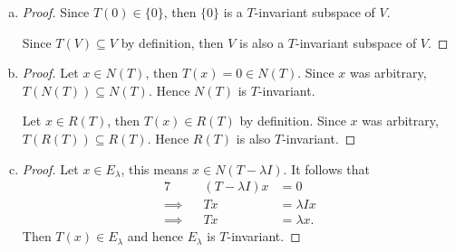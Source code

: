 \begin{Exercise}
\begin{enumerate}[(a)]
\item
\begin{proof}
Since $T(0)\in \{0\}$, then $\{0\}$ is a $T$-invariant subspace of $V$.

Since $T(V)\subseteq V$ by definition, then $V$ is also a $T$-invariant subspace of $V$.
\end{proof}

\item
\begin{proof}
Let $x\in N(T)$, then $T(x) = 0 \in N(T)$. Since $x$ was arbitrary, $T(N(T))\subseteq N(T)$. Hence $N(T)$ is $T$-invariant.

Let $x\in R(T)$, then $T(x) \in R(T)$ by definition. Since $x$ was arbitrary, $T(R(T))\subseteq R(T)$. Hence $R(T)$ is also $T$-invariant.
\end{proof}

\item
\begin{proof}
Let $x\in E_{\lambda}$, this means $x\in N(T-\lambda I)$. It follows that
\begin{alignat*}{7}
\quad&& (T-\lambda I)x &= 0 \\
\implies&& T x &= \lambda I x \\
\implies&& T x &= \lambda x.
\end{alignat*}
Then $T(x) \in E_{\lambda}$ and hence $E_{\lambda}$ is $T$-invariant.
\end{proof}
\end{enumerate}
\end{Exercise}
